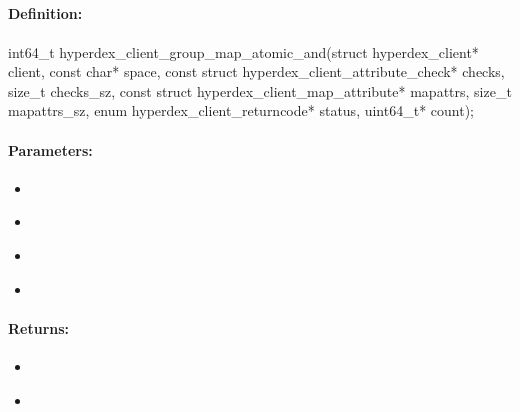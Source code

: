 \pagebreak
\subsection{}
\label{api:c:group_map_atomic_and}


\paragraph{Definition:}
\begin{ccode}
int64_t hyperdex_client_group_map_atomic_and(struct hyperdex_client* client,
        const char* space,
        const struct hyperdex_client_attribute_check* checks, size_t checks_sz,
        const struct hyperdex_client_map_attribute* mapattrs, size_t mapattrs_sz,
        enum hyperdex_client_returncode* status,
        uint64_t* count);
\end{ccode}

\paragraph{Parameters:}
\begin{itemize}[noitemsep]
\item {}\\

\item {}\\

\item {}\\

\item {}\\

\end{itemize}

\paragraph{Returns:}
\begin{itemize}[noitemsep]
\item {}\\

\item {}\\

\end{itemize}

